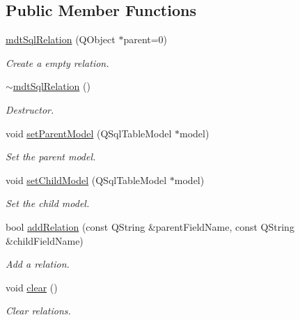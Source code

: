 \subsection*{Public Member Functions}
\begin{DoxyCompactItemize}
\item 
\hypertarget{classmdt_sql_relation_a65d9602a4663c8c356938ba9a217704f}{
\hyperlink{classmdt_sql_relation_a65d9602a4663c8c356938ba9a217704f}{mdtSqlRelation} (QObject $\ast$parent=0)}
\label{classmdt_sql_relation_a65d9602a4663c8c356938ba9a217704f}

\begin{DoxyCompactList}\small\item\em Create a empty relation. \end{DoxyCompactList}\item 
\hypertarget{classmdt_sql_relation_a22c7de1daa71abbde33199a08541310b}{
\hyperlink{classmdt_sql_relation_a22c7de1daa71abbde33199a08541310b}{$\sim$mdtSqlRelation} ()}
\label{classmdt_sql_relation_a22c7de1daa71abbde33199a08541310b}

\begin{DoxyCompactList}\small\item\em Destructor. \end{DoxyCompactList}\item 
void \hyperlink{classmdt_sql_relation_a5ac3a82c5d3e33b5e40b86acfe7e2a03}{setParentModel} (QSqlTableModel $\ast$model)
\begin{DoxyCompactList}\small\item\em Set the parent model. \end{DoxyCompactList}\item 
void \hyperlink{classmdt_sql_relation_ad74021dcf86c528044bf67220ed36833}{setChildModel} (QSqlTableModel $\ast$model)
\begin{DoxyCompactList}\small\item\em Set the child model. \end{DoxyCompactList}\item 
bool \hyperlink{classmdt_sql_relation_aaff5bbdd37b21dd3de4d5d485f7c6a86}{addRelation} (const QString \&parentFieldName, const QString \&childFieldName)
\begin{DoxyCompactList}\small\item\em Add a relation. \end{DoxyCompactList}\item 
void \hyperlink{classmdt_sql_relation_a01469fb1baf7327ca6ddbcd1595e0d7c}{clear} ()
\begin{DoxyCompactList}\small\item\em Clear relations. \end{DoxyCompactList}\end{DoxyCompactItemize}


